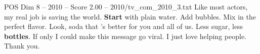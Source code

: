 \begin{textsample}{POS Dim 8 – 2010 – Score 2.00 – 2010/tv\_com\_2010\_3.txt}  \label{ex:f8_pos_051}
Like most actors, my real job is saving the world. \textbf{Start} with plain water.
Add bubbles.
Mix in the perfect flavor.
Look, soda that 's better for you and all of us.
Less sugar, less \textbf{bottles}.
If only I could make this message go viral.
I just love helping people.
Thank you.

\end{textsample}
